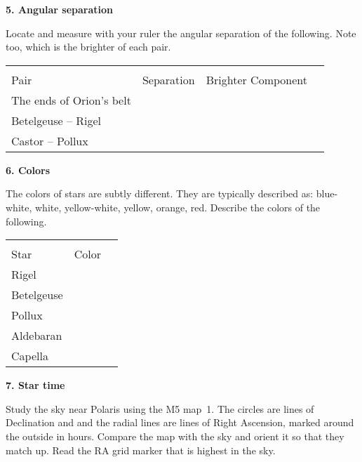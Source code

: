 \documentclass[12pt]{article}
\begin{document}
\bigskip\noindent
{\bf 5. Angular separation}

\bigskip\noindent
Locate and measure with your ruler the angular separation of the following.
Note too, which is the brighter of each pair.

\begin{center}
\begin{tabular}{lccc} \hline \\ [-6pt]
Pair   & \hspace{1cm} Separation \hspace{1cm}& Brighter Component \\ [6pt]
\hline
The ends of Orion's belt      & &        \\ \hline
Betelgeuse -- Rigel     & &       \\ \hline
Castor -- Pollux       & &       \\ \hline
\end{tabular}
\end{center}


\medskip\noindent
{\bf 6. Colors}

\bigskip\noindent 
The colors of stars are subtly different. 
They are typically described as: blue-white, white,
yellow-white, yellow, orange, red.  Describe the colors of the following.
  
\begin{center}
\begin{tabular}{lcc} \hline \\  [-6pt]
Star   &\hspace{1.5cm}  Color \hspace{1.5cm} &  \\  [6pt]
\hline
Rigel    &   &        \\ \hline
Betelgeuse     &   &       \\ \hline
Pollux     &   &       \\ \hline
Aldebaran    &   &       \\  \hline
Capella    &   &     \\  \hline 
\end{tabular}
\end{center}


\medskip\noindent
{\bf 7. Star time}

\bigskip\noindent
Study the sky near Polaris using the M5 map~1.  
The circles are lines of Declination and 
and the radial lines are lines of Right Ascension, marked around the 
outside in hours. Compare the map with the sky and
orient it so that they match up. Read the RA grid marker that is
highest in the sky. 
\end{document}
